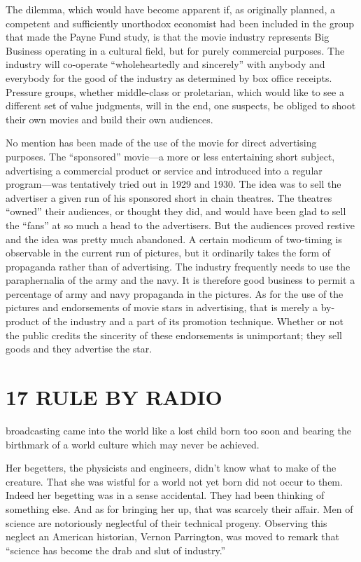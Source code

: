 \documentclass[nohyper,openany,nobib]{tufte-book}
\let\oldchapter\chapter
\def\chapter{%
  \setcounter{footnote}{0}%
  \oldchapter
}
\begin{document}
The dilemma, which would have become apparent if, as originally planned,
a competent and sufficiently unorthodox economist had been included in
the group that made the Payne Fund study, is that the movie industry
represents Big Business operating in a cultural field, but for purely
commercial purposes. The industry will co-operate ``wholeheartedly and
sincerely'' with anybody and everybody for the good of the industry as
determined by box office receipts. Pressure groups, whether middle-class
or proletarian, which would like to see a different set of value
judgments, will in the end, one suspects, be obliged to shoot their own
movies and build their own audiences.

No mention has been made of the use of the movie for direct advertising
purposes. The ``sponsored'' movie---a more or less entertaining short
subject, advertising a commercial product or service and introduced into
a regular program---was tentatively tried out in 1929 and 1930. The idea
was to sell the advertiser a given run of his sponsored short in chain
theatres. The theatres ``owned'' their audiences, or thought they did,
and would have been glad to sell the ``fans'' at so much a head to the
advertisers. But the audiences proved restive and the idea was pretty
much abandoned. A certain modicum of two-timing is observable in the
current run of pictures, but it ordinarily takes the form of propaganda
rather than of advertising. The industry frequently needs to use the
paraphernalia of the army and the navy. It is therefore good business to
permit a percentage of army and navy propaganda in the pictures. As for
the use of the pictures and endorsements of movie stars in advertising,
that is merely a by-product of the industry and a part of its promotion
technique. Whether or not the public credits the sincerity of these
endorsements is unimportant; they sell goods and they advertise the
star.



\chapter[17 \hspace*{1mm} RULE BY RADIO]{17 RULE BY RADIO}


 broadcasting came into the world like a lost child born too soon
and bearing the birthmark of a world culture which may never be
achieved.

Her begetters, the physicists and engineers, didn't know what to make of
the creature. That she was wistful for a world not yet born did not
occur to them. Indeed her begetting was in a sense accidental. They had
been thinking of something else. And as for bringing her up, that was
scarcely their affair. Men of science are notoriously neglectful of
their technical progeny. Observing this neglect an American historian,
Vernon Parrington, was moved to remark that ``science has become the
drab and slut of industry.''
\end{document}
